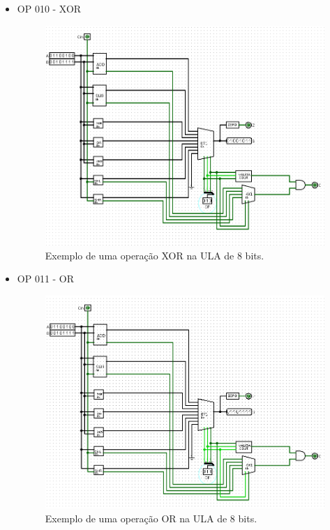 \documentclass[
	12pt,				%
	openright,			%
	twoside,			%
	a4paper,			%
	english,			%
	french,				%
	spanish,			%
	brazil,				%
	]{abntex2}
\begin{document}
\begin{apendicesenv}
\begin{itemize}
\newpage
\item{OP 010 - XOR}

\begin{figure}[H]
	\begin{center}
	    \includegraphics[scale=0.5]{imagens/alu8010xor.png}
	\end{center}
\caption{\label{alu8010xor}Exemplo de uma operação XOR na ULA de 8 bits.}
\end{figure}

\newpage
\item{OP 011 - OR}

\begin{figure}[H]
	\begin{center}
	    \includegraphics[scale=0.5]{imagens/alu8011or.png}
	\end{center}
\caption{\label{alu8011or}Exemplo de uma operação OR na ULA de 8 bits.}
\end{figure}


\end{itemize}
\end{apendicesenv}
\end{document}
